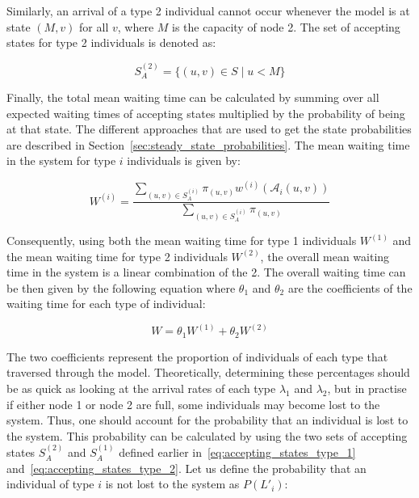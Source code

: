 Similarly, an arrival of a type 2 individual cannot occur whenever the model is
at state \((M, v)\) for all \(v\), where \(M\) is the capacity of node 2.
The set of accepting states for type 2 individuals is denoted as:

\begin{equation}\label{eq:accepting_states_type_2}
    S_A^{(2)} = \{(u, v) \in S \; | \; u < M \}
\end{equation}



Finally, the total mean waiting time can be calculated by summing over all
expected waiting times of accepting states multiplied by the probability of
being at that state.
The different approaches that are used to get the state probabilities are
described in Section~\ref{sec:steady_state_probabilities}.
The mean waiting time in the system for type \(i\) individuals is given by:

\begin{equation}\label{eq:recursive_waiting_time_for_type_i}
    W^{(i)} = \frac{\sum_{(u,v) \in S_A^{(i)}} \pi_{(u,v)} w^{(i)}
    (\mathcal{A}_i(u,v))}{\sum_{(u,v) \in S_A^{(i)}} \pi_{(u,v)}}
\end{equation}

Consequently, using both the mean waiting time for type 1 individuals
\(W^{(1)}\) and the mean waiting time for type 2 individuals \(W^{(2)}\), the
overall mean waiting time in the system is a linear combination of the 2.
The overall waiting time can be then given by the following equation where
\(\theta_1\) and \(\theta_2\) are the coefficients of the waiting time for each
type of individual:

\begin{equation}\label{eq:overall_waiting_time_coeff}
    W = \theta_1 W^{(1)} + \theta_2 W^{(2)}
\end{equation}

The two coefficients represent the proportion of individuals of each type that
traversed through the model.
Theoretically, determining these percentages should be as quick as
looking at the arrival rates of each type \(\lambda_1\) and \(\lambda_2\), but
in practise if either node 1 or node 2 are full, some
individuals may become lost to the system.
Thus, one should account for the probability that an individual is lost to the
system.
This probability can be calculated by using the two sets of accepting
states \(S_A^{(2)}\) and \(S_A^{(1)}\) defined earlier
in~\eqref{eq:accepting_states_type_1} and~\eqref{eq:accepting_states_type_2}.
Let us define the probability that an individual of type \(i\) is not lost
to the system as \(P(L'_i)\):

